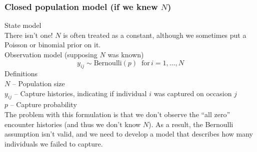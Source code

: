 \documentclass[color=usenames,dvipsnames]{beamer}\usepackage[]{graphicx}\usepackage[]{color}
\begin{document}



\begin{frame}
  \frametitle{\large Closed population model (if we knew $N$) }
  \small
  State model \\
  \vspace{6pt}
  {\centering
    There isn't one! $N$ is often treated as a constant, although we
    sometimes put a Poisson or binomial prior on it.  \\
  }
  \pause
  \vfill
  Observation model (supposing $N$ was known)
  \begin{equation*}
    y_{ij} \sim \mathrm{Bernoulli}(p) \;\; \mathrm{for}\, i=1,\dots,N 
  \end{equation*}
  \pause
  \small
  Definitions \\
  {\footnotesize
  $N$ -- Population size \\
  \hangindent=0.8cm $y_{ij}$ -- Capture histories, indicating if
  individual $i$ was captured on occasion $j$ \\  
  $p$ -- Capture probability \\
  \pause
  \vfill
  The problem with this formulation is that we don't observe the ``all
  zero'' encounter histories (and thus we don't know $N$). \pause As a
  result, the Bernoulli assumption isn't valid, and we need to develop
  a model that describes how many individuals we failed to capture.
  }
\end{frame}
\end{document}
